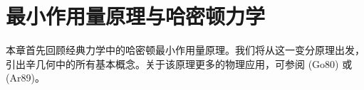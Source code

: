 \chapter{最小作用量原理与哈密顿力学}
\label{ch:least-action}

本章首先回顾经典力学中的哈密顿最小作用量原理。我们将从这一变分原理出发，引出辛几何中的所有基本概念。关于该原理更多的物理应用，可参阅 (Go80) 或 (Ar89)。






